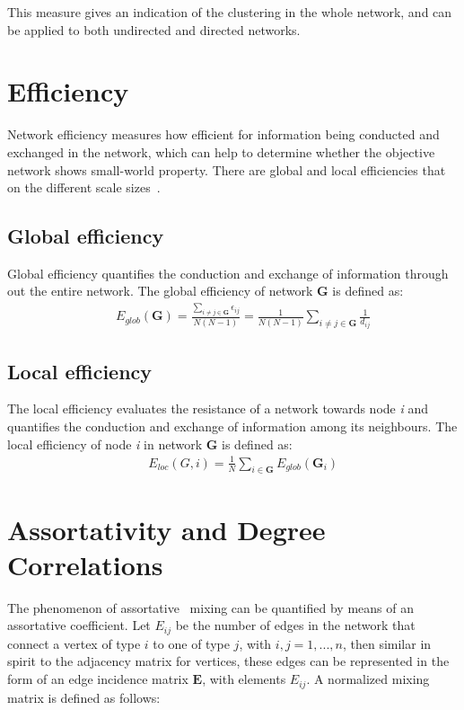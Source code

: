 This measure gives an indication of the clustering in the whole network, and can be applied to both undirected and directed networks.

\section{Efficiency}
Network efficiency measures how efficient for information being conducted and exchanged in the network, which can help to determine whether the objective network shows small-world property. There are global and local efficiencies that on the different scale sizes~\cite{latora2001efficient}.

\subsection{Global efficiency}
Global efficiency quantifies the conduction and exchange of information through out the entire network. The global efficiency of network \textbf{G} is defined as:
\begin{eqnarray}
&&E_{glob}(\textbf{G})=\frac{\sum_{i \neq j \in \textbf{G}} \epsilon_{ij}}{N(N-1)}=\frac{1}{N(N-1)}\sum_{i \neq j \in \textbf{G}} \frac{1}{d_{ij}}
\end{eqnarray}

\subsection{Local efficiency}
The local efficiency evaluates the resistance of a network towards node \textit{i} and quantifies the conduction and exchange of information among its neighbours. The local efficiency of node \textit{i} in network \textbf{G} is defined as:
\begin{eqnarray}
&&E_{loc}(G, i)=\frac{1}{N} \sum_{i \in \textbf{G}} E_{glob}(\textbf{G}_i)
\end{eqnarray}

\section{Assortativity and Degree Correlations}

The phenomenon of assortative~\cite{newman2002assortative} mixing can be quantified by means of an assortative
coefficient. Let $E_{ij}$ be the number of edges in the network that connect
a vertex of type $i$ to one of type $j$, with $i, j=1, . . . , n$, then similar in spirit to the
adjacency matrix for vertices, these edges can be represented in the form of an edge
incidence matrix $\mathbf{E}$, with elements $E_{ij}$. A normalized mixing matrix is defined as follows:

